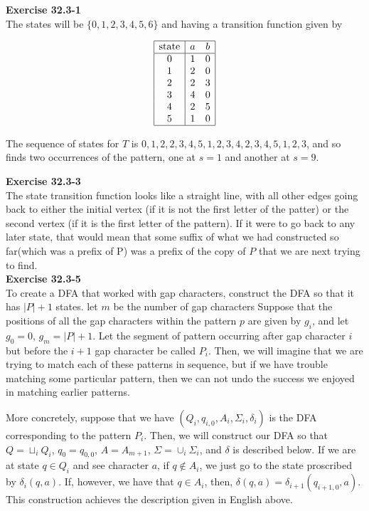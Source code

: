 \documentclass{article}
\begin{document}
\noindent\textbf{Exercise 32.3-1}\\

The states will be $\{0,1,2,3,4,5,6\}$ and having a transition function given by

\[
\begin{array}{|c|cc|}
\hline
\hbox{state}&a&b\\
\hline
0&1&0\\
1&2&0\\
2&2&3\\
3&4&0\\
4&2&5\\
5&1&0\\
\hline
\end{array}
\]

The sequence of states for $T$ is $0,1,2,2,3,4,5,1,2,3,4,2,3,4,5,1,2,3$, and so finds two occurrences of the pattern, one at $s=1$ and another at $s= 9$.




\noindent\textbf{Exercise 32.3-3}\\

The state transition function looks like a straight line, with all other edges going back to either the initial vertex (if it is not the first letter of the patter) or the second vertex (if it is the first letter of the pattern). If it were to go back to any later state, that would mean that some suffix of what we had constructed so far(which was a prefix of P) was a prefix of the copy of $P$ that we are next trying to find.\\




\noindent\textbf{Exercise 32.3-5}\\

To create a DFA that worked with gap characters, construct the DFA so that it has $|P|+1$ states. let $m$ be the number of gap characters Suppose that the positions of all the gap characters within the pattern $p$ are given by $g_i$, and let $g_0=0$, $g_m = |P|+1$. Let the segment of pattern occurring after gap character $i$ but before the $i+1$ gap character be called $P_i$. Then, we will imagine that we are trying to match each of these patterns in sequence, but if we have trouble matching some particular pattern, then we can not undo the success we enjoyed in matching earlier patterns. 

More concretely, suppose that we have $(Q_i,q_{i,0},A_i,\Sigma_i,\delta_i)$ is the DFA corresponding to the pattern $P_i$. Then, we will construct our DFA so that $Q = \sqcup_i Q_i$, $q_0 = q_{0,0}$, $A = A_{m+1}$, $\Sigma = \cup_i \Sigma_i$, and $\delta$ is described below. If we are at state $q\in Q_i$ and see character $a$, if $q\not\in A_i$, we just go to the state proscribed by $\delta_i(q,a)$. If, however, we have that $q \in A_i$, then, $\delta(q,a) = \delta_{i+1}(q_{i+1,0},a)$. This construction achieves the description given in English above.\\
\end{document}
